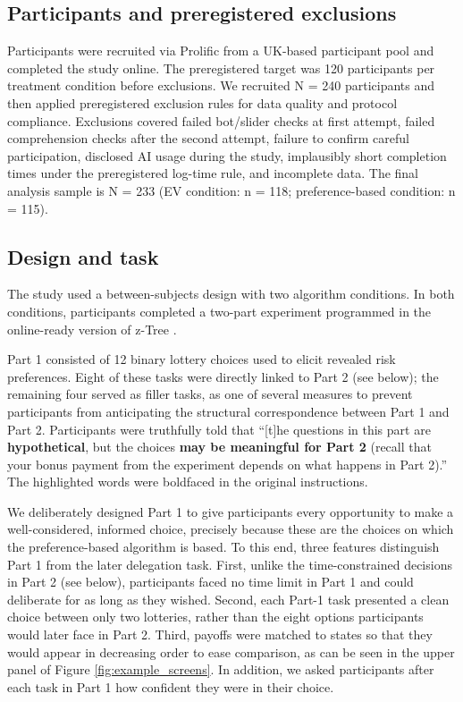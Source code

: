 \documentclass[a4paper, 12pt, fleqn]{article}
\theoremstyle{definition}
\begin{document}
\subsection{Participants and preregistered exclusions}
Participants were recruited via Prolific from a UK-based participant pool and completed the study online. The preregistered target was 120 participants per treatment condition before exclusions. We recruited N = 240 participants and then applied preregistered exclusion rules for data quality and protocol compliance. Exclusions covered failed bot/slider checks at first attempt, failed comprehension checks after the second attempt, failure to confirm careful participation, disclosed AI usage during the study, implausibly short completion times under the preregistered log-time rule, and incomplete data. The final analysis sample is N = 233 (EV condition: n = 118; preference-based condition: n = 115).

\subsection{Design and task}
The study used a between-subjects design with two algorithm conditions. In both conditions, participants completed a two-part experiment programmed in the online-ready version of z-Tree \citep[version 6.0.0 beta 69,][]{Fischbacher07}.

Part 1 consisted of 12 binary lottery choices used to elicit revealed risk preferences. Eight of these tasks were directly linked to Part 2 (see below); the remaining four served as filler tasks, as one of several measures to prevent participants from anticipating the structural correspondence between Part 1 and Part 2. Participants were truthfully told that ``[t]he questions in this part are \textbf{hypothetical}, but the choices \textbf{may be meaningful for Part 2} (recall that your bonus payment from the experiment depends on what happens in Part 2).'' The highlighted words were boldfaced in the original instructions. 

We deliberately designed Part 1 to give participants every opportunity to make a well-considered, informed choice, precisely because these are the choices on which the preference-based algorithm is based. To this end, three features distinguish Part 1 from the later delegation task. First, unlike the time-constrained decisions in Part 2 (see below), participants faced no time limit in Part 1 and could deliberate for as long as they wished. Second, each Part-1 task presented a clean choice between {only two} lotteries, rather than the eight options participants would later face in Part 2. Third, payoffs were matched to states so that they would appear in decreasing order to ease comparison, as can be seen in the upper panel of Figure \ref{fig:example_screens}. In addition, we asked participants after each task in Part 1 how confident they were in their choice.
\end{document}
